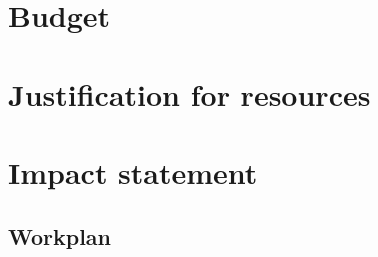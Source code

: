 \documentclass[a4paper,11pt]{article}
\begin{document}
    \newpage
    \section{Budget}

    \newpage
    \section{Justification for resources}

    \newpage
    \section{Impact statement}

    \newpage
    \begin{landscape}
    \section{Workplan}


\end{landscape}
\end{document}
